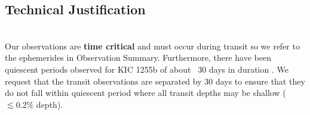 \documentclass[letterpaper,12pt]{article}
\begin{document}
%
%
%
%
%

\clearpage

\subsection{Technical Justification}

\\
Our observations are \textbf{time critical} and must occur during transit so we refer to the ephemerides in Observation Summary.
Furthermore, there have been quiescent periods observed for KIC 1255b of about ~30 days in duration \citep{vanWerkhoven2014}.
We request that the transit observations are separated by 30 days to ensure that they do not fall within quiescent period where all transit depths may be shallow ($\lesssim 0.2\%$ depth).
\newline
\end{document}
